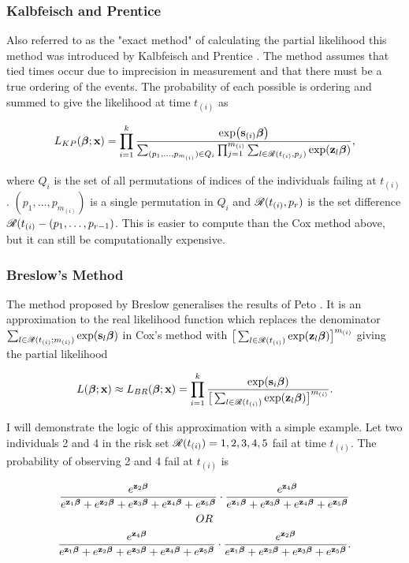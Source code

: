 \subsubsection{Kalbfeisch and Prentice}

Also referred to as the "exact method" of calculating the partial likelihood this method was introduced by Kalbfeisch and Prentice . The method assumes that tied times occur due to imprecision in measurement and that there must be a true ordering of the events. The probability of each possible is ordering and summed to give the likelihood at time $t_{(i)}$ as

\begin{equation}
    L_{KP}(\boldsymbol{\beta};\textbf{x})=\prod_{i=1}^k\frac{\exp(\textbf{s}_{(i)}\boldsymbol{\beta})}{\sum_{(p_1,\ldots,p_{m_{(i)}})\in Q_i}\prod_{j=1}^{m_{(i)}}\sum_{l\in\mathscr{R}(t_{(i)},p_j)}\exp(\textbf{z}_l\boldsymbol{\beta})},
\end{equation}

where $Q_i$ is the set of all permutations of indices of the individuals failing at $t_{(i)}$. $(p_1,\ldots,p_{m_{(i)}})$ is a single permutation in $Q_i$ and $\mathscr{R}(t_{(i)},p_r)$ is the set difference $\mathscr{R}(t_{(i)}-(p_1,\ldots,p_{r-1})$. This is easier to compute than the Cox method above, but it can still be computationally expensive.

\subsubsection{Breslow's Method}

The method proposed by Breslow  generalises the results of Peto . It is an approximation to the real likelihood function which replaces the denominator $\sum_{l\in\mathscr{R}(t_{(i)};m_{(i)})}\exp(\textbf{s}_l\boldsymbol{\beta})$ in Cox's method with $\big[\sum_{l\in\mathscr{R}(t_{(i)})}\exp(\textbf{z}_l\boldsymbol{\beta})\big]^{m_{(i)}}$ giving the partial likelihood

\begin{equation}
    L(\boldsymbol{\beta};\textbf{x})\approx L_{BR}(\boldsymbol{\beta};\textbf{x})=\prod_{i=1}^k\frac{\exp(\textbf{s}_i\boldsymbol{\beta})}{\big[\sum_{l\in\mathscr{R}(t_{(i)})}\exp(\textbf{z}_l\boldsymbol{\beta})\big]^{m_{(i)}}}.
\end{equation}

I will demonstrate the logic of this approximation with a simple example. Let two individuals 2 and 4 in the risk set $\mathscr{R}(t_{(i)})={1,2,3,4,5}$ fail at time $t_{(i)}$. The probability of observing 2 and 4 fail at $t_{(i)}$ is

\begin{gather*}
    \frac{e^{\textbf{z}_2\boldsymbol{\beta}}}{e^{\textbf{z}_1\boldsymbol{\beta}}+e^{\textbf{z}_2\boldsymbol{\beta}}+e^{\textbf{z}_3\boldsymbol{\beta}}+e^{\textbf{z}_4\boldsymbol{\beta}}+e^{\textbf{z}_5\boldsymbol{\beta}}}\cdot\frac{e^{\textbf{z}_4\boldsymbol{\beta}}}{e^{\textbf{z}_1\boldsymbol{\beta}}+e^{\textbf{z}_3\boldsymbol{\beta}}+e^{\textbf{z}_4\boldsymbol{\beta}}+e^{\textbf{z}_5\boldsymbol{\beta}}}\\
    OR\\
    \frac{e^{\textbf{z}_4\boldsymbol{\beta}}}{e^{\textbf{z}_1\boldsymbol{\beta}}+e^{\textbf{z}_2\boldsymbol{\beta}}+e^{\textbf{z}_3\boldsymbol{\beta}}+e^{\textbf{z}_4\boldsymbol{\beta}}+e^{\textbf{z}_5\boldsymbol{\beta}}}\cdot\frac{e^{\textbf{z}_2\boldsymbol{\beta}}}{e^{\textbf{z}_1\boldsymbol{\beta}}+e^{\textbf{z}_2\boldsymbol{\beta}}+e^{\textbf{z}_3\boldsymbol{\beta}}+e^{\textbf{z}_5\boldsymbol{\beta}}}.
\end{gather*}

